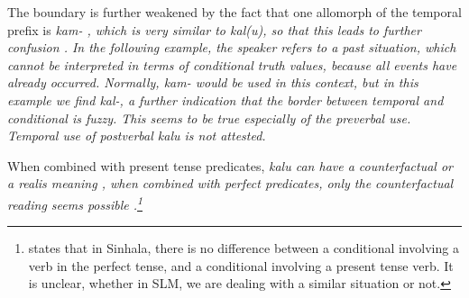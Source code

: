 The boundary is further weakened by the fact that one allomorph of the  temporal prefix  is \em kam- \em {}, which is very similar to \em kal(u)\em, so that this leads to further confusion \citep{Slomanson2008ismil}. In the following example, the speaker refers to a past situation, which cannot be interpreted in terms of conditional truth values, because all events have already occurred. Normally, \em kam- \em would be used in this context, but in this example we find \em kal-\em, a further indication that the border between temporal and conditional is fuzzy. This seems to be true especially of the preverbal use. Temporal use of postverbal \em kalu \em is not attested.



When combined with present tense predicates, \em kalu \em can have a counterfactual   or a realis  meaning , when combined with perfect predicates, only the counterfactual reading seems possible .\footnote{\citet[46]{Jayawardena2004} states that in Sinhala, there is no difference between a conditional involving a verb in the perfect tense, and a conditional involving a present tense verb. It is unclear, whether in SLM, we are dealing with a similar situation or not.}





